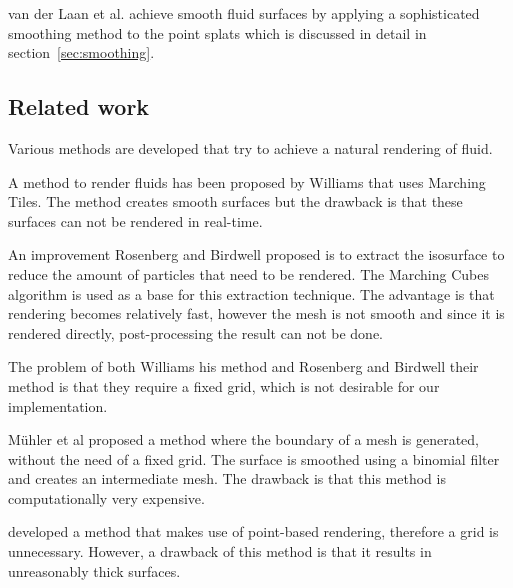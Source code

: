 van der Laan et al. achieve smooth fluid surfaces by applying a sophisticated smoothing method to the point splats which is discussed in detail in section~\ref{sec:smoothing}.

\subsection{Related work}
Various methods are developed that try to achieve a natural rendering of fluid.

A method to render fluids has been proposed by Williams \cite{williams2008fluid} that uses Marching Tiles. 
The method creates smooth surfaces but the drawback is that these surfaces can not be rendered in real-time.

An improvement Rosenberg and Birdwell \cite{rosenberg2008real} proposed is to extract the isosurface to reduce the amount of particles that need to be rendered.
The Marching Cubes algorithm is used as a base for this extraction technique.
The advantage is that rendering becomes relatively fast, however the mesh is not smooth and since it is rendered directly, post-processing the result can not be done.

The problem of both Williams his method and Rosenberg and Birdwell their method is that they require a fixed grid, which is not desirable for our implementation. 

M\"uhler et al\cite{muller2007screen} proposed a method where the boundary of a mesh is generated, without the need of a fixed grid.
The surface is smoothed using a binomial filter and creates an intermediate mesh.
The drawback is that this method is computationally very expensive.

\cite{zhang2008adaptive} developed a method that makes use of point-based rendering, therefore a grid is unnecessary.
However, a drawback of this method is that it results in unreasonably thick surfaces.
